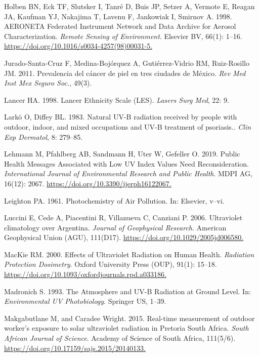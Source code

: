 \documentclass[10pt]{article}
\begin{document}
\label{csl:65}Holben BN, Eck TF, Slutsker I, Tanr{\'{e}} D, Buis JP, Setzer A, Vermote E, Reagan JA, Kaufman YJ, Nakajima T, Lavenu F, Jankowiak I, Smirnov A. 1998. {{AERONET}{\textemdash}A Federated Instrument Network and Data Archive for Aerosol Characterization}. \textit{Remote Sensing of Environment}. Elsevier {BV}, 66(1): 1–16. \url{https://doi.org/10.1016/s0034-4257(98)00031-5.}

\label{csl:37}Jurado-Santa-Cruz F, Medina-Bojórquez A, Gutiérrez-Vidrio RM, Ruiz-Rosillo JM. 2011. {Prevalencia del cáncer de piel en tres ciudades de México}. \textit{Rev Med Inst Mex Seguro Soc.}, 49(3).

\label{csl:46}Lancer HA. 1998. {Lancer Ethnicity Scale (LES)}. \textit{Lasers Surg Med}, 22: 9.

\label{csl:51}Lark\"o O, Diffey BL. 1983. {Natural UV-B radiation received by people with outdoor, indoor, and mixed occupations and UV-B treatment of psoriasis.}. \textit{Clin Exp Dermatol}, 8: 279–85.

\label{csl:33}Lehmann M, Pfahlberg AB, Sandmann H, Uter W, Gefeller O. 2019. {Public Health Messages Associated with Low {UV} Index Values Need Reconsideration}. \textit{International Journal of Environmental Research and Public Health}. {MDPI} {AG}, 16(12): 2067. \url{https://doi.org/10.3390/ijerph16122067.}

\label{csl:9}Leighton PA. 1961. {Photochemistry of Air Pollution}. In: Elsevier, v--vi.

\label{csl:58}Luccini E, Cede A, Piacentini R, Villanueva C, Canziani P. 2006. {Ultraviolet climatology over Argentina}. \textit{Journal of Geophysical Research}. American Geophysical Union ({AGU}), 111(D17). \url{https://doi.org/10.1029/2005jd006580.}

\label{csl:34}MacKie RM. 2000. {Effects of Ultraviolet Radiation on Human Health}. \textit{Radiation Protection Dosimetry}. Oxford University Press ({OUP}), 91(1): 15–18. \url{https://doi.org/10.1093/oxfordjournals.rpd.a033186.}

\label{csl:55}Madronich S. 1993. {The Atmosphere and {UV}-B Radiation at Ground Level}. In: \textit{Environmental {UV} Photobiology}. Springer {US}, 1–39.

\label{csl:52}Makgabutlane M, and Caradee Wright. 2015. {Real-time measurement of outdoor worker's exposure to solar ultraviolet radiation in Pretoria South Africa}. \textit{South African Journal of Science}. Academy of Science of South Africa, 111(5/6). \url{https://doi.org/10.17159/sajs.2015/20140133.}
\end{document}
